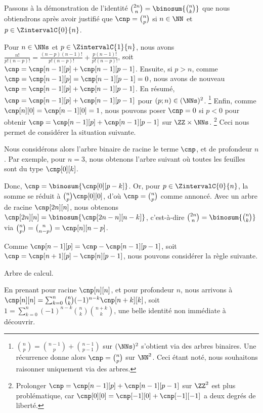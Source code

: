 Passons à la démonstration de 
l'identité $\binom{2n}{n} = \binosum{\binom{n}{k}}$
que nous obtiendrons après avoir justifié que
$\cnp = \binom{n}{p}$ si $n \in \NN$ et $p \in \ZintervalC{0}{n}$.


Pour $n \in \NNs$ et $p \in \ZintervalC{1}{n}$,
nous avons
$\frac{n!}{p!(n-p)!}
=\frac{(n-p)(n-1)!}{p!(n-p)!} + \frac{p(n-1)!}{p!(n-p)!}$,
soit
$\cnp = \cnp[n-1][p] + \cnp[n-1][p-1]$.
Ensuite,
si $p > n$, comme
$\cnp = \cnp[n-1][p] = \cnp[n-1][p-1] = 0$,
nous avons de nouveau
$\cnp = \cnp[n-1][p] + \cnp[n-1][p-1]$.
En résumé,
$\cnp = \cnp[n-1][p] + \cnp[n-1][p-1]$ pour $(p;n) \in (\NNs)^2$.%
\footnote{
	$\binom{n}{p} = \binom{n-1}{p} + \binom{n-1}{p-1}$ sur $ (\NNs)^2$
	s'obtient via des arbres binaires.
	Une récurrence donne alors 
	$\cnp = \binom{n}{p}$ sur $\NN^2$.
	Ceci étant noté, nous souhaitons raisonner uniquement via des arbres.
}
Enfin,
comme
$\cnp[n][0] = \cnp[n-1][0] = 1$,
nous pouvons poser
$\cnp = 0$ si $p < 0$
pour obtenir
$\cnp = \cnp[n-1][p] + \cnp[n-1][p-1]$ sur $\ZZ \times \NNs$.%
\footnote{
	Prolonger $\cnp = \cnp[n-1][p] + \cnp[n-1][p-1]$ sur $\ZZ^2$ est plus problématique, car $\cnp[0][0] = \cnp[-1][0] + \cnp[-1][-1]$ a deux degrés de liberté.
}
%
Ceci nous permet de considérer la situation suivante.

\explaintree{\cnp}{\cnp[n-1][p-1]}{\cnp[n-1][p]}%
            {\factobinomintertree}{}


Nous considérons alors l'arbre binaire de racine le terme $\cnp$, et de profondeur $n$.
Par exemple, pour $n=3$, nous obtenons l'arbre suivant où toutes les feuilles sont du type $\cnp[0][k]$.


Donc,
$\cnp = \binosum{\cnp[0][p-k]}$.
Or, pour $p \in \ZintervalC{0}{n}$, la somme se réduit à $\binom{n}{p} \cnp[0][0]$, d'où $\cnp = \binom{n}{p}$ comme annoncé.
%
Avec un arbre de racine $\cnp[2n][n]$, nous obtenons
$\cnp[2n][n] = \binosum{\cnp[2n - n][n-k]}$,
c'est-à-dire
$\binom{2n}{n} = \binosum{\binom{n}{k}}$
via
$\binom{n}{p} = \binom{n}{n - p} = \cnp[n][n-p]$.




\begin{remark}
	Comme $\cnp[n-1][p] = \cnp - \cnp[n-1][p-1]$,
	soit $\cnp = \cnp[n+1][p] - \cnp[n][p-1]$,
	nous pouvons considérer la règle suivante.

    \begin{center}
    	\itshape\centering
    
    	\calctree{\cnp}{\cnp[n+1][p]}{-\cnp[n][p-1]}
    	
    	Arbre de calcul.
    \end{center}
    
    En prenant pour racine $\cnp[n][n]$, et pour profondeur $n$,
	nous arrivons à
    $\cnp[n][n] = \sum_{k=0}^n \binom{n}{k} (-1)^{n-k} \cnp[n+k][k]$,
    soit
    $1 = \sum_{k=0}^n (-1)^{n-k} \binom{n}{k} \binom{n+k}{k}$,
    une belle identité non immédiate à découvrir.
\end{remark}
